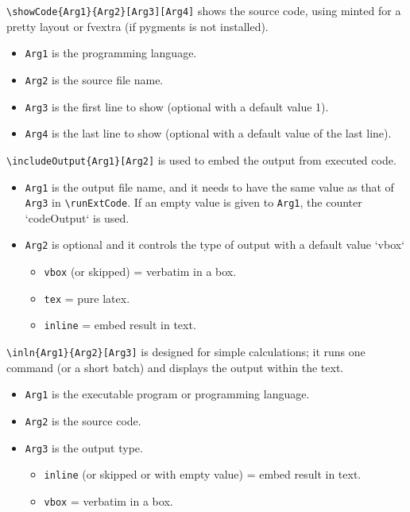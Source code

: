 \documentclass{ltxdoc}
\begin{document}
\bigskip
\noindent \verb|\showCode{Arg1}{Arg2}[Arg3][Arg4]| shows the source code, using minted for a pretty layout or fvextra (if pygments is not installed). 
\begin{itemize}
\item \texttt{Arg1} is the programming language.
\item \texttt{Arg2} is the source file name.
\item \texttt{Arg3} is the first line to show (optional with a default value 1).
\item \texttt{Arg4} is the last line to show (optional with a default value of the last line).
\end{itemize}

\bigskip
\noindent \verb|\includeOutput{Arg1}[Arg2]| is used to embed the output from executed code.
\begin{itemize}
\item \texttt{Arg1} is the output file name, and it needs to have the same value as that of \texttt{Arg3} in \verb|\runExtCode|. If an empty value is given to \texttt{Arg1}, the counter `codeOutput` is used. 
\item \texttt{Arg2} is optional and it controls the type of output with a default value `vbox` 
\begin{itemize}
\item \texttt{vbox} (or skipped) = verbatim in a box.
\item \texttt{tex} = pure latex.
\item \texttt{inline} = embed result in text. 
\end{itemize}
\end{itemize}

\bigskip
\noindent \verb|\inln{Arg1}{Arg2}[Arg3]| is designed for simple calculations; it runs one command (or a short batch) and displays the output within the text. 
\begin{itemize}
\item \texttt{Arg1} is the executable program or programming language. 
\item \texttt{Arg2} is the source code. 
\item \texttt{Arg3} is the output type.
\begin{itemize}
\item \texttt{inline} (or skipped or with empty value) = embed result in text.
\item \texttt{vbox} = verbatim in a box.
\end{itemize}
\end{itemize}
\end{document}

